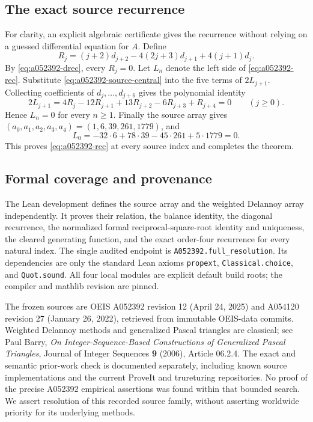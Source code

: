 \subsection{The exact source recurrence}

For clarity, an explicit algebraic certificate gives the recurrence
without relying on a guessed differential equation for $A$. Define
\[
 R_j=(j+2)d_{j+2}-4(2j+3)d_{j+1}+4(j+1)d_j.
\]
By \eqref{eq:a052392-drec}, every $R_j=0$.
Let $L_n$ denote the left side of \eqref{eq:a052392-rec}.
Substitute \eqref{eq:a052392-source-central} into the five terms of
$2L_{j+1}$. Collecting coefficients of $d_j,\ldots,d_{j+6}$ gives the
polynomial identity
\[
 2L_{j+1}=4R_j-12R_{j+1}+13R_{j+2}-6R_{j+3}+R_{j+4}=0
 \qquad(j\ge0).
\]
Hence $L_n=0$ for every $n\ge1$. Finally the source array gives
$(a_0,a_1,a_2,a_3,a_4)=(1,6,39,261,1779)$, and
\[
 L_0=-32\cdot6+78\cdot39-45\cdot261+5\cdot1779=0.
\]
This proves \eqref{eq:a052392-rec} at every source index and completes
the theorem.

\subsection{Formal coverage and provenance}

The Lean development defines the source array and the weighted Delannoy
array independently. It proves their relation, the balance identity,
the diagonal recurrence, the normalized formal reciprocal-square-root
identity and uniqueness, the cleared generating function, and the exact
order-four recurrence for every natural index. The single audited
endpoint is \texttt{A052392.full\_resolution}. Its dependencies are only
the standard Lean axioms \texttt{propext}, \texttt{Classical.choice}, and
\texttt{Quot.sound}. All four local modules are explicit default build
roots; the compiler and mathlib revision are pinned.

The frozen sources are OEIS A052392 revision 12 (April 24, 2025) and
A054120 revision 27 (January 26, 2022), retrieved from immutable
OEIS-data commits. Weighted Delannoy methods and generalized Pascal
triangles are classical; see Paul Barry, \emph{On Integer-Sequence-Based
Constructions of Generalized Pascal Triangles}, Journal of Integer
Sequences \textbf{9} (2006), Article 06.2.4. The exact and semantic
prior-work check is documented separately, including known source
implementations and the current ProveIt and trureturing repositories.
No proof of the precise A052392 empirical assertions was found within
that bounded search. We assert resolution of this recorded source
family, without asserting worldwide priority for its underlying methods.
